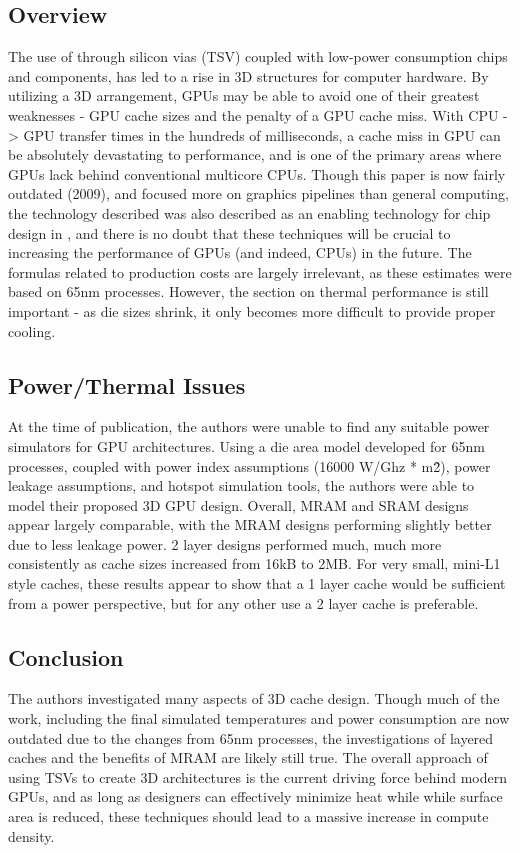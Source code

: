 \documentclass[conference]{IEEEtran}
\begin{document}
\subsection{Overview}
The use of through silicon vias (TSV) coupled with low-power consumption chips
and components, has led to a rise in 3D structures for computer hardware. By 
utilizing a 3D arrangement, GPUs may be able to avoid one of their greatest 
weaknesses - GPU cache sizes and the penalty of a GPU cache miss. With 
CPU -> GPU transfer times in the hundreds of milliseconds, a cache miss in GPU
can be absolutely devastating to performance, and is one of the primary areas
where GPUs lack behind conventional multicore CPUs. Though 
this paper is now fairly outdated \cite{cachestacking} (2009), and focused more
on graphics pipelines than general computing,
the technology described was also described as an enabling technology for
chip design in \cite{gtc}, and there is no doubt that these techniques will
be crucial to increasing the performance of GPUs (and indeed, CPUs)
in the future. The formulas related to production costs are largely irrelevant,
as these estimates were based on 65nm processes. However, the section on
thermal performance is still important - as die sizes shrink, it only becomes
more difficult to provide proper cooling.

\subsection{Power/Thermal Issues}
At the time of publication, the authors were unable to find any suitable power
simulators for GPU architectures. Using a die area model developed for 65nm
processes, coupled with power index assumptions (16000 W/Ghz * m\^2), power
leakage assumptions, and hotspot simulation tools, the authors were able to 
model their proposed 3D GPU design. Overall, MRAM and SRAM designs appear 
largely comparable, with the MRAM designs performing slightly better due to
less leakage power. 2 layer designs performed much, much more consistently
as cache sizes increased from 16kB to 2MB. For very small, mini-L1 style caches,
these results appear to show that a 1 layer cache would be sufficient from a 
power perspective, but for any other use a 2 layer cache is preferable.

\subsection{Conclusion}
The authors investigated many aspects of 3D cache design. Though much of the 
work, including the final simulated temperatures and power consumption are now
outdated due to the changes from 65nm processes, the investigations of layered 
caches and the benefits of MRAM are likely still true. The overall approach of 
using TSVs to create 3D architectures is the current driving force behind 
modern GPUs, and as long as designers can effectively minimize heat while 
while surface area is reduced, these techniques should lead to a massive 
increase in compute density.
\end{document}
